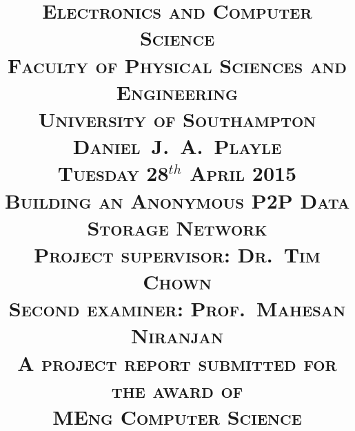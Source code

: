 \title{ 
	\vspace{-1.0cm}
	\large{
		\textsc{Electronics and Computer Science}\\
		\textsc{Faculty of Physical Sciences and Engineering}\\
		\textsc{University of Southampton}\\
	}
	\large{
		\vspace{2.5cm}
		\textsc{Daniel~J.~A.~Playle}\\
		\vspace{1.0cm}
		\textsc{Tuesday 28$^{th}$ April 2015}\\
	}
		\vspace{2.5cm}
	\LARGE{
		\textsc{
			Building an Anonymous P2P Data Storage Network\\
		}
	}
	\large{
		\vspace{3.5cm}
		\textsc{Project supervisor: Dr.~Tim Chown}\\
		\textsc{Second examiner: Prof.~Mahesan Niranjan}\\
		\vspace{1.5cm}
		\textsc{A project report submitted for the award of}\\
		\textsc{MEng Computer Science\vspace{-3.0cm}}}
	}
\author{}
\date{}
\maketitle